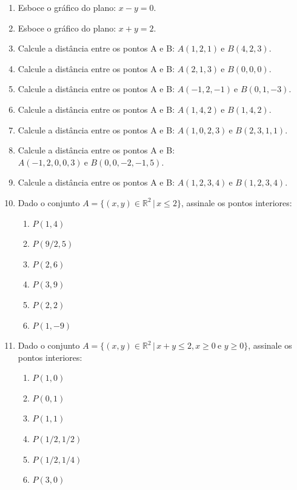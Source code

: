 \documentclass[11pt,a4paper]{article}
\begin{document}
\begin{enumerate}
\item Esboce o gráfico do plano: $x - y = 0$.
\item Esboce o gráfico do plano: $x + y = 2$.
\item Calcule a distância entre os pontos A e B: $A(1,2,1)\ \textrm{e } B(4,2,3)$.
\item Calcule a distância entre os pontos A e B: $A(2,1,3)\ \textrm{e } B(0,0,0)$.
\item Calcule a distância entre os pontos A e B: $A(-1,2,-1)\ \textrm{e } B(0,1,-3)$.
\item Calcule a distância entre os pontos A e B: $A(1,4,2)\ \textrm{e } B(1,4,2)$.
\item Calcule a distância entre os pontos A e B: $A(1,0,2,3)\ \textrm{e } B(2,3,1,1)$.
\item Calcule a distância entre os pontos A e B: $A(-1,2,0,0,3)\ \textrm{e } B(0,0,-2,-1,5)$.










\item Calcule a distância entre os pontos A e B: $A(1,2,3,4)\ \textrm{e } B(1,2,3,4)$.

\item Dado o conjunto $A = \{(x,y) \in \mathbb{R}^2 \,|\, x \leq 2\}$, assinale os pontos interiores:
	\begin{enumerate}
		\item $P(1,4)$
		\item $P(9/2,5)$
		\item $P(2,6)$
		\item $P(3,9)$
		\item $P(2,2)$
		\item $P(1,-9)$
	\end{enumerate}	
	
\item Dado o conjunto $A = \{(x,y) \in \mathbb{R}^2 \,|\, x + y \leq 2, x \geq 0\ \textrm{e } y \geq 0 \}$, assinale os pontos interiores:
	\begin{enumerate}
		\item $P(1,0)$
		\item $P(0,1)$
		\item $P(1,1)$
		\item $P(1/2,1/2)$
		\item $P(1/2,1/4)$
		\item $P(3,0)$
	\end{enumerate}		


\end{enumerate}
\end{document}
